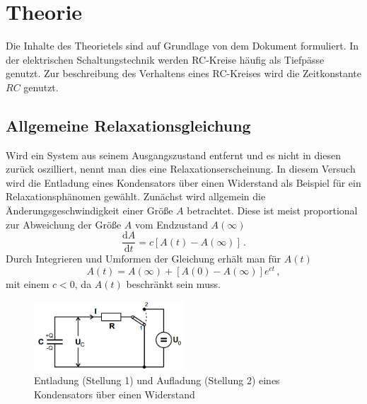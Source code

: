 \section{Theorie}
\label{sec:Theorie}
Die Inhalte des Theorietels sind auf Grundlage von dem Dokument \cite{V353} formuliert.
In der elektrischen Schaltungstechnik werden RC-Kreise häufig als Tiefpässe genutzt. 
Zur beschreibung des Verhaltens eines RC-Kreises wird die Zeitkonstante $RC$ genutzt.
\subsection{Allgemeine Relaxationsgleichung}
Wird ein System aus seinem Ausgangszustand entfernt und es nicht in diesen zurück oszilliert, nennt man dies eine Relaxationserscheinung.
In diesem Versuch wird die Entladung eines Kondensators über einen Widerstand als Beispiel für ein Relaxationsphänomen gewählt.
Zunächst wird allgemein die Änderungsgeschwindigkeit einer Größe $A$ betrachtet. Diese ist meist proportional zur Abweichung der Größe $A$ vom Endzustand $A(\infty)$
\begin{equation*}
    \frac{\text{d}A}{\text{d}t}=c[A(t)-A(\infty)] \, .
\end{equation*}
Durch Integrieren und Umformen der Gleichung erhält man für $A(t)$
\begin{equation}
    A(t)=A(\infty)+[A(0)-A(\infty)]e^{ct} \, ,
\end{equation}
mit einem $c<0$, da $A(t)$ beschränkt sein muss.
\begin{figure}
    \centering
    \caption{Entladung (Stellung 1) und Aufladung (Stellung 2) eines Kondensators über einen Widerstand} 
    \label{fig:auf-ent}
    \includegraphics[width = 0.5\textwidth]{pics/auf-ent.png}
\end{figure}
